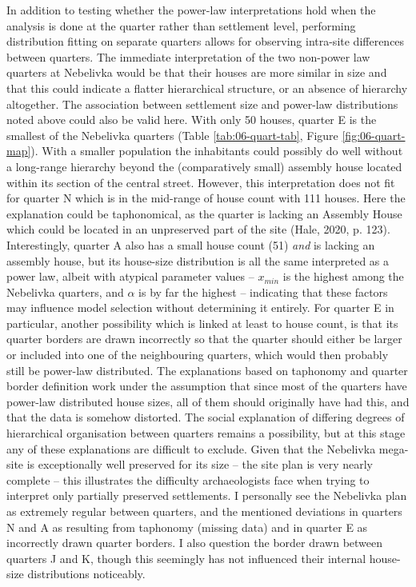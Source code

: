 \documentclass[
  12pt,
]{book}
\begin{document}
In addition to testing whether the power-law interpretations hold when the analysis is done at the quarter rather than settlement level, performing distribution fitting on separate quarters allows for observing intra-site differences between quarters. The immediate interpretation of the two non-power law quarters at Nebelivka would be that their houses are more similar in size and that this could indicate a flatter hierarchical structure, or an absence of hierarchy altogether. The association between settlement size and power-law distributions noted above could also be valid here. With only 50 houses, quarter E is the smallest of the Nebelivka quarters (Table \ref{tab:06-quart-tab}, Figure \ref{fig:06-quart-map}). With a smaller population the inhabitants could possibly do well without a long-range hierarchy beyond the (comparatively small) assembly house located within its section of the central street. However, this interpretation does not fit for quarter N which is in the mid-range of house count with 111 houses. Here the explanation could be taphonomical, as the quarter is lacking an Assembly House which could be located in an unpreserved part of the site (Hale, 2020, p. 123). Interestingly, quarter A also has a small house count (51) \emph{and} is lacking an assembly house, but its house-size distribution is all the same interpreted as a power law, albeit with atypical parameter values -- \(x_{min}\) is the highest among the Nebelivka quarters, and \(\alpha\) is by far the highest -- indicating that these factors may influence model selection without determining it entirely. For quarter E in particular, another possibility which is linked at least to house count, is that its quarter borders are drawn incorrectly so that the quarter should either be larger or included into one of the neighbouring quarters, which would then probably still be power-law distributed. The explanations based on taphonomy and quarter border definition work under the assumption that since most of the quarters have power-law distributed house sizes, all of them should originally have had this, and that the data is somehow distorted. The social explanation of differing degrees of hierarchical organisation between quarters remains a possibility, but at this stage any of these explanations are difficult to exclude. Given that the Nebelivka mega-site is exceptionally well preserved for its size -- the site plan is very nearly complete -- this illustrates the difficulty archaeologists face when trying to interpret only partially preserved settlements. I personally see the Nebelivka plan as extremely regular between quarters, and the mentioned deviations in quarters N and A as resulting from taphonomy (missing data) and in quarter E as incorrectly drawn quarter borders. I also question the border drawn between quarters J and K, though this seemingly has not influenced their internal house-size distributions noticeably.
\end{document}
